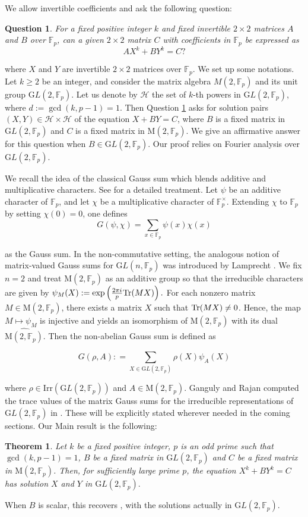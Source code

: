 \documentclass[12pt,reqno]{amsart}
\theoremstyle{plain}
\newtheorem{theorem}[thm]{Theorem}
\newtheorem{question}[thm]{Question}
\theoremstyle{definition}
\newcommand{\Tr}{{\rm Tr}}
\newcommand{\GL}{{\mathrm GL}}
\newcommand{\M}{\mathrm{M}}
\newcommand{\irr}{\mathrm{Irr}}
\newcommand{\sH}{{\mathcal H}}
\theoremstyle{remark}
\newcommand{\FF}{\mathbb{F}}
\begin{document}
We allow invertible coefficients and ask the following question:
\begin{question}\label{question}
    For a fixed positive integer $k$ and fixed invertible $2 \times 2$ matrices $A$ and $B$ over $\FF_p$, can a given $2 \times 2$ matrix $C$ with coefficients in $\FF_p$ be expressed as $$AX^k+BY^k=C?$$ 
\end{question}
where $X$ and $Y$ are invertible $2 \times 2$ matrices over $\FF_p$.
We set up some notations. 
Let $k\geq2$ be an integer, and consider the matrix algebra $M(2,\FF_p)$ and its unit group $\GL(2,\FF_p)$. Let us denote by $\sH$ the set of $k$-th powers in $\GL(2, \FF_p)$, where $d:=\gcd(k,p-1)=1$. Then Question \ref{question} asks for solution pairs $(X,Y) \in \sH \times \sH$ of the equation $X +BY=C$, where $B$ is a fixed matrix in $\GL(2, \FF_p)$ and $C$ is a fixed matrix in $\M(2, \FF_p).$ We give an affirmative answer for this question when $B \in \GL(2, \FF_p)$. Our proof relies on Fourier analysis over $\GL(2, \FF_p).$  

We recall the idea of the classical Gauss sum which blends additive and multiplicative characters. See \cite[Section 8.5]{apostol2013introduction} for a detailed treatment. Let $\psi$ be an additive character of $\FF_p$, and let $\chi$ be a multiplicative character of $\FF_p^{\times}.$ Extending $\chi$ to $\FF_p$ by setting $\chi(0)=0$, one defines $$G(\psi, \chi) = \sum_{x \in \FF_p} \psi(x) \chi(x)$$

as the Gauss sum. In the non-commutative setting, the analogous notion of matrix-valued Gauss sums for $\GL(n, \FF_p)$ was introduced by Lamprecht \cite{lamprecht1957struktur}. We fix $n=2$ and treat $\M(2, \FF_p)$ as an additive group so that the irreducible characters are given by $\psi_M(X):= \exp \left( \frac{2 \pi i }{p} \Tr(MX) \right).$ For each nonzero matrix $M \in\M(2, \FF_p)$, there exists a matrix $X$ such that $\Tr(MX) \neq 0$. Hence, the map $M \mapsto \psi_M$ is injective and yields an isomorphism of $\M(2,\FF_p)$ with its dual $\widehat{\M(2, \FF_p)}$. Then the non-abelian Gauss sum is defined as 

$$G(\rho ,A) : = \sum_{X \in \GL(2, \FF_p)} \rho(X)\psi_A(X)$$

where $\rho \in\irr(\GL(2, \FF_p))$ and $A \in \M(2, \FF_p)$. Ganguly and Rajan computed the trace values of the matrix Gauss sums for the irreducible representations of $\GL(2,\FF_p)$ in \cite{ganguly2023singular}. These will be explicitly stated wherever needed in the coming sections. Our Main result is the following:
\begin{theorem}\label{thm: main result}
   Let $k$ be a fixed positive integer, $p$ is an odd prime such that $\gcd(k, p-1) =1$, $B$ be a fixed matrix in $\GL(2,\FF_p)$ and $C$ be a fixed matrix in $\M(2,\FF_p)$. Then, for sufficiently large prime $p$, the equation $X^k+BY^k=C$ has solution $X$ and $Y$ in $\GL(2, \FF_p).$
\end{theorem}
When $B$ is scalar, this recovers \cite[Theorem A.6]{panjasainisingh25}, with the solutions actually in $\GL(2,\FF_p)$. 
\end{document}
